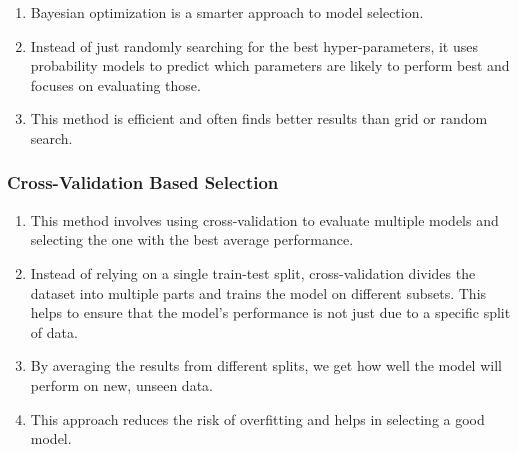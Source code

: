 \begin{enumerate}
    \item Bayesian optimization is a smarter approach to model selection. 
    \hfill \cite{geeksforgeeks/machine-learning/model-selection-for-machine-learning}
    
    \item Instead of just randomly searching for the best hyper-parameters, it uses probability models to predict which parameters are likely to perform best and focuses on evaluating those. 
    \hfill \cite{geeksforgeeks/machine-learning/model-selection-for-machine-learning}
    
    \item This method is efficient and often finds better results than grid or random search.
    \hfill \cite{geeksforgeeks/machine-learning/model-selection-for-machine-learning}
\end{enumerate}



\subsubsection{Cross-Validation Based Selection}

\begin{enumerate}
    \item This method involves using cross-validation to evaluate multiple models and selecting the one with the best average performance. 
    \hfill \cite{geeksforgeeks/machine-learning/model-selection-for-machine-learning}
    
    \item Instead of relying on a single train-test split, cross-validation divides the dataset into multiple parts and trains the model on different subsets. 
    This helps to ensure that the model’s performance is not just due to a specific split of data. 
    \hfill \cite{geeksforgeeks/machine-learning/model-selection-for-machine-learning}
    
    \item By averaging the results from different splits, we get how well the model will perform on new, unseen data. 
    \hfill \cite{geeksforgeeks/machine-learning/model-selection-for-machine-learning}
    
    \item This approach reduces the risk of overfitting and helps in selecting a good model.
    \hfill \cite{geeksforgeeks/machine-learning/model-selection-for-machine-learning}
\end{enumerate}

















